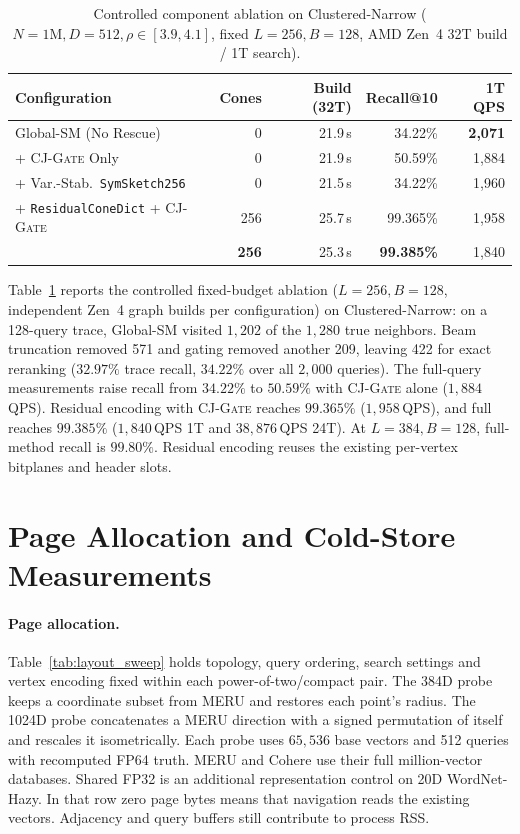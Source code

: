 \begin{table}[h]
  \centering
  \caption{Controlled component ablation on {Clustered-Narrow} ($N=1\text{M}, D=512, \rho \in [3.9, 4.1]$, fixed $L=256, B=128$, AMD Zen~4 32T build / 1T search).}
  \label{tab:app_stage_audit}
  \small
  \setlength{\tabcolsep}{3pt}
  \begin{tabularx}{\linewidth}{@{}>{\raggedright\arraybackslash}Xrrrr@{}}
    \toprule
    \textbf{Configuration} & \textbf{Cones} & \textbf{Build (32T)} & \textbf{Recall@10} & \textbf{1T QPS} \\
    \midrule
    Global-SM (No Rescue) & 0 & 21.9\,s & 34.22\% & \textbf{2,071} \\
    + \textsc{CJ-Gate} Only & 0 & 21.9\,s & 50.59\% & 1,884 \\
    + Var.-Stab.\ \texttt{SymSketch256} & 0 & 21.5\,s & 34.22\% & 1,960 \\
    + \texttt{ResidualConeDict} + \textsc{CJ-Gate} & 256 & 25.7\,s & 99.365\% & 1,958 \\
    \textbf{\rquiver{}} & \textbf{256} & 25.3\,s & \textbf{99.385\%} & 1,840 \\
    \bottomrule
  \end{tabularx}
\end{table}

Table~\ref{tab:app_stage_audit} reports the controlled fixed-budget ablation ($L=256, B=128$, independent Zen~4 graph builds per configuration) on {Clustered-Narrow}:
on a 128-query trace, {Global-SM} visited $1{,}202$ of the $1{,}280$ true neighbors. Beam truncation removed 571 and gating removed another 209, leaving 422 for exact reranking ($32.97\%$ trace recall, $34.22\%$ over all $2{,}000$ queries).
The full-query measurements raise recall from $34.22\%$ to $50.59\%$ with \textsc{CJ-Gate} alone ($1{,}884$\,QPS). Residual encoding with \textsc{CJ-Gate} reaches $99.365\%$ ($1{,}958$\,QPS), and full \rquiver{} reaches $99.385\%$ ($1{,}840$\,QPS 1T and $38{,}876$\,QPS 24T). At $L=384,B=128$, full-method recall is $99.80\%$. Residual encoding reuses the existing per-vertex bitplanes and header slots.

\section{Page Allocation and Cold-Store Measurements}
\label{app:storage_measurements}

\paragraph{Page allocation.}
Table~\ref{tab:layout_sweep} holds topology, query ordering, search settings and vertex encoding fixed within each power-of-two/compact pair. The 384D probe keeps a coordinate subset from MERU and restores each point's radius. The 1024D probe concatenates a MERU direction with a signed permutation of itself and rescales it isometrically. Each probe uses $65{,}536$ base vectors and 512 queries with recomputed FP64 truth. MERU and Cohere use their full million-vector databases. Shared FP32 is an additional representation control on 20D WordNet-Hazy. In that row zero page bytes means that navigation reads the existing vectors. Adjacency and query buffers still contribute to process RSS.

